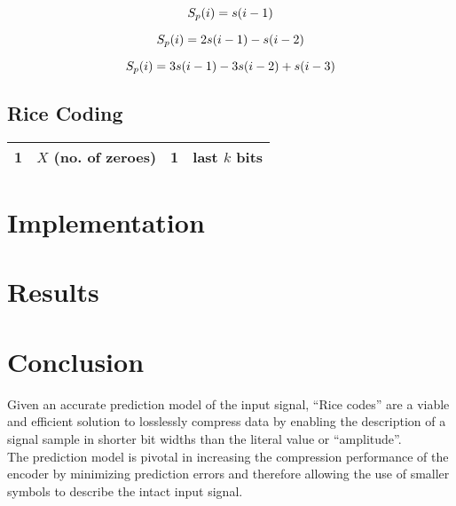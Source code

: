 \documentclass{article}
\begin{document}
\begin{equation}
S_p(i) = s(i-1) \\
\end{equation}

\begin{equation}
S_p(i) = 2s(i-1) - s(i-2) \\
\end{equation}

\begin{equation}
S_p(i) = 3s(i-1) - 3s(i-2) + s(i-3) \\
\end{equation}

\subsection*{Rice Coding}
\begin{center}
\begin{tabular}{|r|c|c|l|}
  \hline
  \textbf{1} & $X$ (no. of zeroes) & \textbf{1} & last $k$ bits \\
  \hline
\end{tabular}
\end{center}

\section*{Implementation}

\section*{Results}

\section*{Conclusion}
Given an accurate prediction model of the input signal, ``Rice codes'' are a viable and efficient solution to losslessly compress data by enabling the description of a signal sample in shorter bit widths than the literal value or ``amplitude''. \\ 

The prediction model is pivotal in increasing the compression performance of the encoder by minimizing prediction errors and therefore allowing the use of smaller symbols to describe the intact input signal. \\
\end{document}
